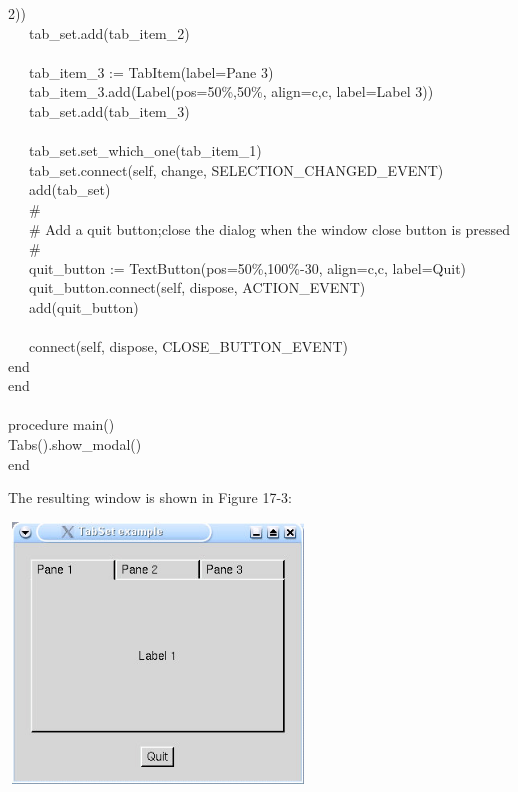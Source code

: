 {2{\textquotedbl})) \\
\>   \ \ \ tab\_set.add(tab\_item\_2) \\
\ \\
\>   \ \ \ tab\_item\_3 := TabItem({\textquotedbl}label=Pane
3{\textquotedbl}) \\
\>   \ \ \ tab\_item\_3.add(Label({\textquotedbl}pos=50\%,50\%{\textquotedbl},
{\textquotedbl}align=c,c{\textquotedbl}, {\textquotedbl}label=Label
3{\textquotedbl})) \\
\>   \ \ \ tab\_set.add(tab\_item\_3) \\
\ \\
\>   \ \ \ tab\_set.set\_which\_one(tab\_item\_1) \\
\>   \ \ \ tab\_set.connect(self, {\textquotedbl}change{\textquotedbl},
SELECTION\_CHANGED\_EVENT) \\
\>   \ \ \ add(tab\_set) \\
\>   \ \ \ \# \\
\>   \ \ \ \# Add a quit button;close the dialog when the window close button is pressed \\
\>   \ \ \ \# \\
\>   \ \ \ quit\_button :=
TextButton({\textquotedbl}pos=50\%,100\%-30{\textquotedbl},
{\textquotedbl}align=c,c{\textquotedbl},
{\textquotedbl}label=Quit{\textquotedbl}) \\
\>   \ \ \ quit\_button.connect(self,
{\textquotedbl}dispose{\textquotedbl}, ACTION\_EVENT) \\
\>   \ \ \ add(quit\_button) \\
\ \\
\>   \ \ \ connect(self, {\textquotedbl}dispose{\textquotedbl},
CLOSE\_BUTTON\_EVENT) \\
\>   end \\
end \\
\ \\
procedure main() \\
\>   Tabs().show\_modal() \\
end
}


The resulting window is shown in Figure 17-3:

\begin{center}
\includegraphics[width=3.1272in,height=2.7299in]{ub-img/ub-img52.jpg}
\end{center}

